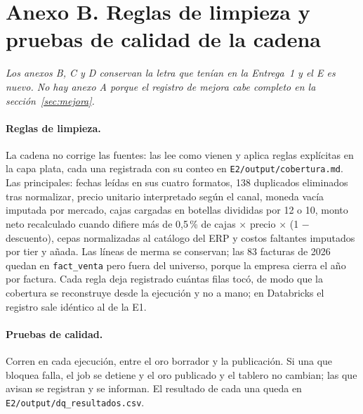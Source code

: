 
\section*{Anexo B. Reglas de limpieza y pruebas de calidad de la cadena}

\noindent\emph{Los anexos B, C y D conservan la letra que tenían en la Entrega~1 y el E es nuevo. No hay anexo A porque el registro de mejora cabe completo en la sección~\ref{sec:mejora}.}

\paragraph{Reglas de limpieza.} La cadena no corrige las fuentes: las lee como vienen y aplica reglas explícitas en la capa plata, cada una registrada con su conteo en \texttt{E2/output/cobertura.md}. Las principales: fechas leídas en sus cuatro formatos, 138 duplicados eliminados tras normalizar, precio unitario interpretado según el canal, moneda vacía imputada por mercado, cajas cargadas en botellas divididas por 12 o 10, monto neto recalculado cuando difiere más de 0,5\,\% de cajas $\times$ precio $\times$ (1 $-$ descuento), cepas normalizadas al catálogo del ERP y costos faltantes imputados por tier y añada. Las líneas de merma se conservan; las 83 facturas de 2026 quedan en \texttt{fact\_venta} pero fuera del universo, porque la empresa cierra el año por factura. Cada regla deja registrado cuántas filas tocó, de modo que la cobertura se reconstruye desde la ejecución y no a mano; en Databricks el registro sale idéntico al de la E1.

\paragraph{Pruebas de calidad.} Corren en cada ejecución, entre el oro borrador y la publicación. Si una que bloquea falla, el job se detiene y el oro publicado y el tablero no cambian; las que avisan se registran y se informan. El resultado de cada una queda en \texttt{E2/output/dq\_resultados.csv}.

